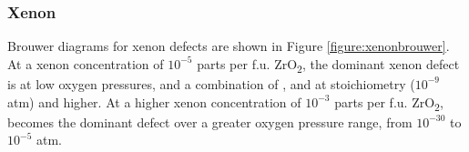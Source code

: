 \documentclass[11pt,a4paper]{article}
\newcommand{\zirconia}{ZrO\textsubscript{2}}
\begin{document}


\subsubsection*{Xenon}

Brouwer diagrams for xenon defects are shown in Figure \ref{figure:xenonbrouwer}. At a xenon concentration of $10^{-5}$ parts per f.u. \zirconia , the dominant xenon defect is  at low oxygen pressures, and a combination of ,  and  at stoichiometry ($10^{-9}$ atm) and higher. At a higher xenon concentration of $10^{-3}$ parts per f.u. \zirconia ,  becomes the dominant defect over a greater oxygen pressure range, from $10^{-30}$ to $10^{-5}$ atm.
\end{document}
